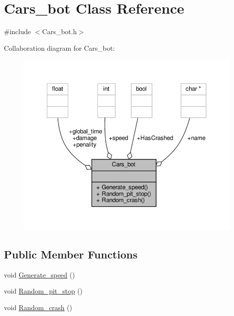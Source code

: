 \hypertarget{class_cars__bot}{}\section{Cars\+\_\+bot Class Reference}
\label{class_cars__bot}


{\ttfamily \#include $<$Cars\+\_\+bot.\+h$>$}



Collaboration diagram for Cars\+\_\+bot\+:
\nopagebreak
\begin{figure}[H]
\begin{center}
\leavevmode
\includegraphics[width=347pt]{class_cars__bot__coll__graph}
\end{center}
\end{figure}
\subsection*{Public Member Functions}
\begin{DoxyCompactItemize}
\item 
void \hyperlink{class_cars__bot_a79d7a174260eb5c633b3067dbdef04e5}{Generate\+\_\+speed} ()
\item 
void \hyperlink{class_cars__bot_a16a23b35ae128f5b905c0d95f56f916e}{Random\+\_\+pit\+\_\+stop} ()
\item 
void \hyperlink{class_cars__bot_ab7d72e0c79e5efd16a0242c950e0dbf8}{Random\+\_\+crash} ()
\end{DoxyCompactItemize}
